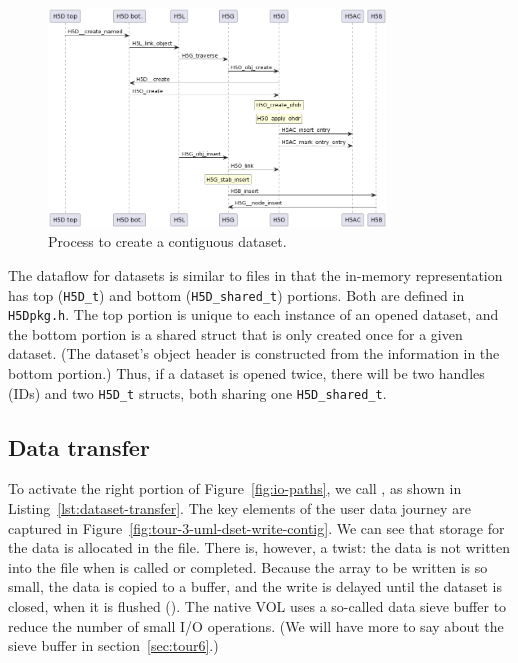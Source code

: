\begin{figure}
    \centering
    \includegraphics[width=0.80\textwidth]{images/tour_3_uml_dset_create.png}
    \caption{Process to create a contiguous dataset.}
    \label{fig:tour-3-uml-dset-create-contig}
\end{figure}

The dataflow for datasets is similar to files in that the in-memory representation has top (\texttt{H5D\_t}) and bottom (\texttt{H5D\_shared\_t}) portions. Both are defined in \texttt{H5Dpkg.h}. The top portion is unique to each instance of an opened dataset, and the bottom portion is a shared struct that is only created once for a given dataset. (The dataset's object header is constructed from the information in the bottom portion.) Thus, if a dataset is opened twice, there will be two handles (IDs) and two \texttt{H5D\_t} structs, both sharing one \texttt{H5D\_shared\_t}.

\subsection{Data transfer}\label{sec:data-transfer}

To activate the right portion of Figure~\ref{fig:io-paths}, we call , as shown in Listing~\ref{lst:dataset-transfer}. The key elements of the user data journey are captured in Figure~\ref{fig:tour-3-uml-dset-write-contig}. We can see that storage for the data is allocated in the file. There is, however, a twist: the data is not written into the file when  is called or completed. Because the array to be written is so small, the data is copied to a buffer, and the write is delayed until the dataset is closed, when it is flushed (). The native VOL uses a so-called data sieve buffer to reduce the number of small I/O operations. (We will have more to say about the sieve buffer in section~\ref{sec:tour6}.)


